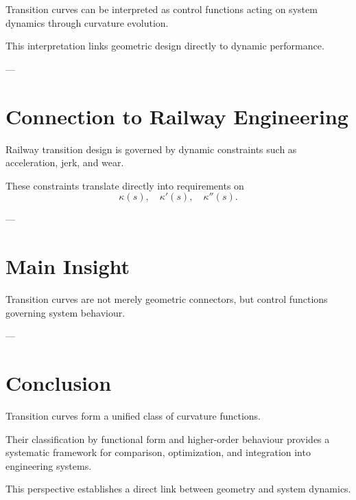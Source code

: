 \begin{proposition}
Transition curves can be interpreted as control functions acting on
system dynamics through curvature evolution.
\end{proposition}

\begin{remark}
This interpretation links geometric design directly to dynamic
performance.
\end{remark}

---

\section{Connection to Railway Engineering}

\begin{remark}
Railway transition design is governed by dynamic constraints such as
acceleration, jerk, and wear.
\end{remark}

\begin{remark}
These constraints translate directly into requirements on
\[
\kappa(s), \quad \kappa'(s), \quad \kappa''(s).
\]
\end{remark}

---

\section{Main Insight}

\begin{theorem}
Transition curves are not merely geometric connectors, but control
functions governing system behaviour.
\end{theorem}

---

\section{Conclusion}

\begin{summary}
Transition curves form a unified class of curvature functions.

Their classification by functional form and higher-order behaviour
provides a systematic framework for comparison, optimization, and
integration into engineering systems.

This perspective establishes a direct link between geometry and system
dynamics.
\end{summary}
